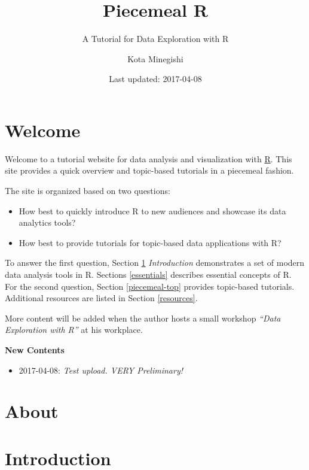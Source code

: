 \documentclass[]{book}
\title{Piecemeal R}
\subtitle{A Tutorial for Data Exploration with R}
\author{Kota Minegishi}
\date{Last updated: 2017-04-08}
\providecommand{\tightlist}{%
  \setlength{\itemsep}{0pt}\setlength{\parskip}{0pt}}
\begin{document}
\maketitle

{
\setcounter{tocdepth}{1}
\tableofcontents
}
\chapter*{Welcome}\label{welcome}

Welcome to a tutorial website for data analysis and visualization with
\href{https://www.r-project.org/}{R}. This site provides a quick
overview and topic-based tutorials in a piecemeal fashion.

The site is organized based on two questions:

\begin{itemize}
\item
  How best to quickly introduce R to new audiences and showcase its data
  analytics tools?
\item
  How best to provide tutorials for topic-based data applications with
  R?
\end{itemize}

To answer the first question, Section \ref{intro} \emph{Introduction}
demonstrates a set of modern data analysis tools in R. Sections
\ref{essentials} describes essential concepts of R. For the second
question, Section \ref{piecemeal-top} provides topic-based tutorials.
Additional resources are listed in Section \ref{resources}.

More content will be added when the author hosts a small workshop
\emph{``Data Exploration with R''} at his workplace.

\textbf{New Contents}

\begin{itemize}
\tightlist
\item
  2017-04-08: {\emph{Test upload. VERY Preliminary!}}
\end{itemize}

\chapter*{About}\label{about}

\chapter{Introduction}\label{intro}
\end{document}
